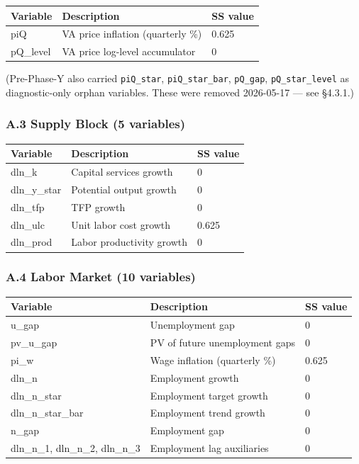\documentclass[
]{article}
\newcounter{none} %
\begin{document}
{\def\LTcaptype{none} %
\begin{longtable}[]{@{}lll@{}}
\toprule\noalign{}
Variable & Description & SS value \\
\midrule\noalign{}
\endhead
\bottomrule\noalign{}
\endlastfoot
piQ & VA price inflation (quarterly \%) & 0.625 \\
pQ\_level & VA price log-level accumulator & 0 \\
\end{longtable}
}

(Pre-Phase-Y also carried \texttt{piQ\_star}, \texttt{piQ\_star\_bar},
\texttt{pQ\_gap}, \texttt{pQ\_star\_level} as diagnostic-only orphan
variables. These were removed 2026-05-17 --- see §4.3.1.)

\subsubsection{A.3 Supply Block (5
variables)}\label{a.3-supply-block-5-variables}

{\def\LTcaptype{none} %
\begin{longtable}[]{@{}lll@{}}
\toprule\noalign{}
Variable & Description & SS value \\
\midrule\noalign{}
\endhead
\bottomrule\noalign{}
\endlastfoot
dln\_k & Capital services growth & 0 \\
dln\_y\_star & Potential output growth & 0 \\
dln\_tfp & TFP growth & 0 \\
dln\_ulc & Unit labor cost growth & 0.625 \\
dln\_prod & Labor productivity growth & 0 \\
\end{longtable}
}

\subsubsection{A.4 Labor Market (10
variables)}\label{a.4-labor-market-10-variables}

{\def\LTcaptype{none} %
\begin{longtable}[]{@{}lll@{}}
\toprule\noalign{}
Variable & Description & SS value \\
\midrule\noalign{}
\endhead
\bottomrule\noalign{}
\endlastfoot
u\_gap & Unemployment gap & 0 \\
pv\_u\_gap & PV of future unemployment gaps & 0 \\
pi\_w & Wage inflation (quarterly \%) & 0.625 \\
dln\_n & Employment growth & 0 \\
dln\_n\_star & Employment target growth & 0 \\
dln\_n\_star\_bar & Employment trend growth & 0 \\
n\_gap & Employment gap & 0 \\
dln\_n\_1, dln\_n\_2, dln\_n\_3 & Employment lag auxiliaries & 0 \\
\end{longtable}
}
\end{document}
